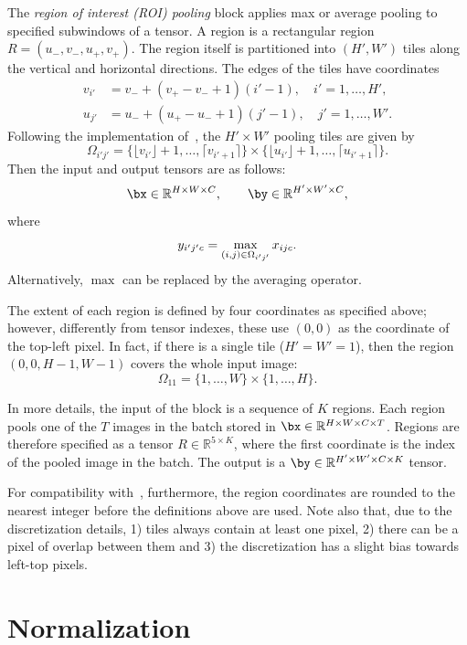 The \emph{region of interest (ROI) pooling} block applies max or average pooling to specified subwindows of a tensor. A region is a rectangular region $R = (u_-,v_-,u_+,v_+)$. The region itself is partitioned into $(H',W')$ tiles along the vertical and horizontal directions. The edges of the tiles have coordinates
\begin{align*}
   v_{i'} &= v_- + (v_+ - v_- + 1) (i' - 1), \quad i' = 1,\dots,H',\\
   u_{j'} &= u_- + (u_+ - u_- + 1) (j' - 1), \quad j' = 1,\dots,W'.
\end{align*}
Following the implementation of~\cite{girshick15fast}, the $H'\times W'$ pooling tiles are given by
\[
   \Omega_{i'j'} =
   \{\lfloor v_{i'} \rfloor + 1, \dots, \lceil v_{i'+1} \rceil\}
   \times
   \{\lfloor u_{i'} \rfloor + 1, \dots, \lceil u_{i'+1} \rceil\}.
\]
Then the input and output tensors are as follows:
\[
  \bx \in \mathbb{R}^{H \times W \times C},
  \qquad
  \by \in \mathbb{R}^{H' \times W' \times C},
\]
where
\[
   y_{i'j'c} = \operatornamewithlimits{max}_{(i,j) \in \Omega_{i'j'}} x_{ijc}.
\]
Alternatively, $\max$ can be replaced by the averaging operator.

The extent of each region is defined by four coordinates as specified above; however, differently from tensor indexes, these use $(0,0)$ as the coordinate of the top-left pixel. In fact, if there is a single tile ($H'=W'=1$), then the region $(0,0,H-1,W-1)$ covers the whole input image:
\[
   \Omega_{11} =
   \{1, \dots, W\}
   \times
   \{1, \dots, H\}.
\]

In more details, the input of the block is a sequence of $K$ regions. Each region pools one of the $T$ images in the batch stored in $\bx \in \mathbb{R}^{H\times W\times C\times T}$. Regions are therefore specified as a tensor $R \in \mathbb{R}^{5 \times K}$, where the first coordinate is the index of the pooled image in the batch. The output is a $\by \in \mathbb{R}^{H' \times W' \times C \times K}$ tensor.

For compatibility with~\cite{girshick15fast}, furthermore, the region coordinates are rounded to the nearest integer before the definitions above are used. Note also that, due to the discretization details, 1) tiles always contain at least one pixel, 2) there can be a pixel of overlap between them and 3) the discretization has a slight bias towards left-top pixels.

\section{Normalization}\label{s:normalization}

